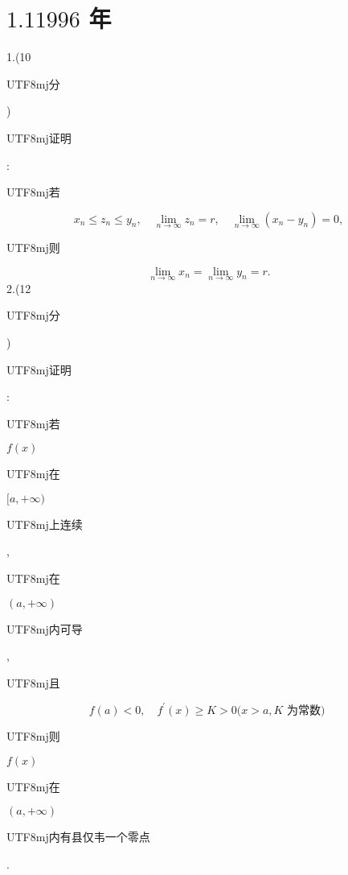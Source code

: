 \documentclass[10pt]{article}
\begin{document}
\section{$1.11996$ 年}
1.(10 \begin{CJK}{UTF8}{mj}分\end{CJK}) \begin{CJK}{UTF8}{mj}证明\end{CJK}: \begin{CJK}{UTF8}{mj}若\end{CJK}
$$
x_{n} \leqslant z_{n} \leqslant y_{n}, \quad \lim _{n \rightarrow \infty} z_{n}=r, \quad \lim _{n \rightarrow \infty}\left(x_{n}-y_{n}\right)=0,
$$
\begin{CJK}{UTF8}{mj}则\end{CJK}
$$
\lim _{n \rightarrow \infty} x_{n}=\lim _{n \rightarrow \infty} y_{n}=r .
$$
2.(12 \begin{CJK}{UTF8}{mj}分\end{CJK}) \begin{CJK}{UTF8}{mj}证明\end{CJK}: \begin{CJK}{UTF8}{mj}若\end{CJK} $f(x)$ \begin{CJK}{UTF8}{mj}在\end{CJK} $[a,+\infty)$ \begin{CJK}{UTF8}{mj}上连续\end{CJK}, \begin{CJK}{UTF8}{mj}在\end{CJK} $(a,+\infty)$ \begin{CJK}{UTF8}{mj}内可导\end{CJK}, \begin{CJK}{UTF8}{mj}且\end{CJK}
$$
f(a)<0, \quad f^{\prime}(x) \geqslant K>0(x>a, K \text { 为常数) }
$$
\begin{CJK}{UTF8}{mj}则\end{CJK} $f(x)$ \begin{CJK}{UTF8}{mj}在\end{CJK} $(a,+\infty)$ \begin{CJK}{UTF8}{mj}内有县仅韦一个零点\end{CJK}.
\end{document}
